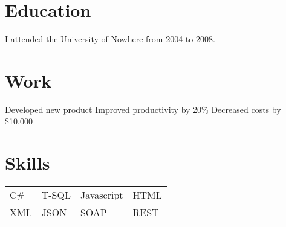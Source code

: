 \documentclass{my_cv}
\begin{document}

\section{Education}
I attended the University of Nowhere from 2004 to 2008.

\section{Work}
\workitems
{Developed new product}
{Improved productivity by 20\%}
{Decreased costs by \$10,000}

\section{Skills}

\begin{tabular}{l l l l}
C\# & T-SQL & Javascript & HTML \\
XML & JSON & SOAP & REST
\end{tabular}
\end{document}
